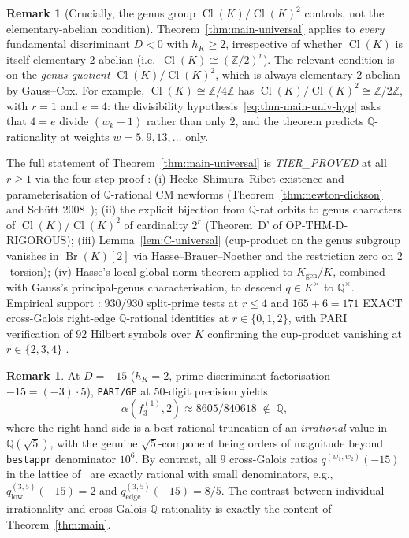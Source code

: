 \documentclass[11pt,a4paper]{amsart}
\theoremstyle{plain}
\theoremstyle{definition}
\newtheorem{remark}[theorem]{Remark}
\DeclareMathOperator{\Cl}{Cl}
\DeclareMathOperator{\Br}{Br}
\newcommand{\Q}{\mathbb{Q}}
\newcommand{\Z}{\mathbb{Z}}
\newcommand{\fl}[2]{f_{#1}^{(#2)}}
\newcommand{\qstr}[2]{q^{(#1,#2)}}
\begin{document}
\begin{remark}[Crucially, the genus group $\Cl(K)/\Cl(K)^2$ controls,
not the elementary-abelian condition]\label{rk:not-elem-abelian}
Theorem~\ref{thm:main-universal} applies to \emph{every} fundamental
discriminant $D < 0$ with $h_K \ge 2$, irrespective of whether
$\Cl(K)$ is itself elementary $2$-abelian
(i.e.\ $\Cl(K) \cong (\Z/2)^r$). The relevant condition is on the
\emph{genus quotient} $\Cl(K)/\Cl(K)^2$, which is always elementary
$2$-abelian by Gauss--Cox. For example, $\Cl(K) \cong \Z/4\Z$ has
$\Cl(K)/\Cl(K)^2 \cong \Z/2\Z$, with $r = 1$ and $e = 4$: the
divisibility hypothesis~\eqref{eq:thm-main-univ-hyp} asks that
$4 = e$ divide $(w_k - 1)$ rather than only $2$, and the theorem
predicts $\Q$-rationality at weights $w = 5, 9, 13, \ldots$ only.

The full statement of Theorem~\ref{thm:main-universal} is
\textit{TIER\_PROVED} at all $r \ge 1$ via the four-step proof :
(i) Hecke--Shimura--Ribet existence and parameterisation of
$\Q$-rational CM newforms (Theorem~\ref{thm:newton-dickson} and
Sch\"utt 2008~\cite{Schutt2008}); (ii) the explicit bijection from
$\Q$-rat orbits to genus characters of $\Cl(K)/\Cl(K)^2$ of
cardinality $2^r$ (Theorem~D' of OP-THM-D-RIGOROUS); (iii)
Lemma~\ref{lem:C-universal} (cup-product on the genus subgroup
vanishes in $\Br(K)[2]$ via Hasse--Brauer--Noether and the restriction
zero on $2$-torsion); (iv) Hasse's local-global norm theorem applied
to $K_{\mathrm{gen}}/K$, combined with Gauss's principal-genus
characterisation, to descend $q \in K^\times$ to $\Q^\times$.
Empirical support : $930/930$ split-prime tests at $r \le 4$
\cite[OP-NEWTON-DICKSON-HK4-EXTEND]{Remondiere2026ND} and $165 + 6 = 171$
EXACT cross-Galois right-edge $\Q$-rational identities at
$r \in \{0, 1, 2\}$, with PARI verification of $92$ Hilbert symbols
over $K$ confirming the cup-product vanishing at $r \in \{2, 3, 4\}$
\cite[OP-LEMMA-C-FORMAL-K2]{Remondiere2026K2}.
\end{remark}

\begin{remark}\label{rk:emp-individual}
At $D = -15$ ($h_K = 2$, prime-discriminant factorisation
$-15 = (-3)\cdot 5$), \texttt{PARI/GP} at $50$-digit precision yields
\[
   \alpha(\fl{3}{1}, 2) \approx 8605/840618 \;\notin\; \Q,
\]
where the right-hand side is a best-rational truncation of an
\emph{irrational} value in $\Q(\sqrt{5})$, with the genuine
$\sqrt{5}$-component being orders of magnitude beyond \texttt{bestappr}
denominator $10^6$.  By contrast, all $9$ cross-Galois ratios
$\qstr{w_1}{w_2}(-15)$ in the lattice of~\cite{Remondiere2026P6} are
exactly rational with small denominators, e.g.,
$\qstr{3}{5}_{\mathrm{low}}(-15) = 2$ and
$\qstr{3}{5}_{\mathrm{edge}}(-15) = 8/5$.
The contrast between individual irrationality and cross-Galois
$\Q$-rationality is exactly the content of Theorem~\ref{thm:main}.
\end{remark}
\end{document}
